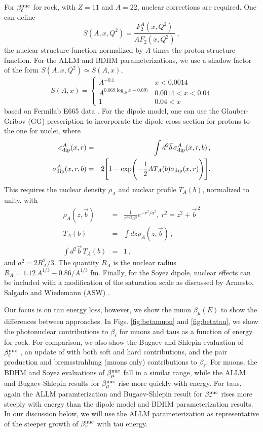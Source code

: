 \documentclass[aps,10pt,twocolumn,tightenlines]{revtex4-1}
\begin{document}
For $\beta_\ell^{\rm nuc}$ for rock, with $Z=11$ and $A=22$, nuclear corrections are required. 
One can define
\begin{equation}
S (A,x,Q^2) = \frac{F_2^A(x,Q^2)}{A F_2(x, Q^2)}\ ,
\end{equation}
the nuclear structure function normalized by $A$ times the proton structure function.
For the ALLM and BDHM parameterizations, we use a shadow factor  of the form $S(A,x,Q^2)\simeq
S(A,x)$,
\[
S(A,x)
= \left\{ \begin{array} {cl}
A^{-0.1} & x<0.0014 \\
A^{0.069\log_{10}x+0.097 }& 0.0014<x<0.04 \\
1 & 0.04<x
\end{array}\right.
\]
based on Fermilab E665 data \cite{Adams:1992vm,Adams:1992nf,Adams:1995is}. For the dipole model, one can use the
Glauber-Gribov (GG) prescription to incorporate the dipole cross section for 
 protons to the one for nuclei, where 
\begin{eqnarray}
\sigma_{\rm dip}^A(x,r)&=&\int d^2\vec{b}\, \sigma_{\rm dip}^A(x,r,b)\, ,\\
\sigma_{\rm dip}^A(x,r,b) &=& 2\Biggl[ 1-\exp\Biggl( -\frac{1}{2} AT_A(b)\sigma_{\rm dip}(x,r)\Biggr)\Biggr] .
\end{eqnarray}
This requires the nuclear density $\rho_A$ and nuclear profile $T_A(b)$, normalized to unity, with
\begin{eqnarray}
\rho_A (z,\vec{b}) &= &\frac{1}{\pi^{3/2} a^3} e^{-r^2/a^2},\   r^2=z^2+\vec{b}^{\, 2}\\
T_A(b) &=& \int dz\rho_A(z,\vec{b})\, ,\\
\int d^2 \vec{b}\, T_A(b)&=& 1\ ,
\end{eqnarray}
and $a^2=2 R_A^2/3$. The quantity $R_A$ is the nuclear radius $R_A = 1.12\, A^{1/3}-0.86/A^{1/3}$ fm.
Finally, for the Soyez dipole, nuclear effects can be included with a modification of the saturation scale as discussed 
by 
Armesto, Salgado and Wiedemann (ASW) \cite{Armesto:2004ud}.

Our focus is on tau energy loss, however, we show the muon $\beta_\mu(E)$ to show the differences between approaches. 
In Figs. \ref{fig:betamuon} and \ref{fig:betatau}, we show the photonuclear contributions to $\beta_\ell$ for muons and taus as a function of 
energy for rock. 
For comparison, we also show the Bugaev and Shlepin evaluation of $\beta_\ell^{\rm nuc}$ \cite{Bugaev:2002gy}, an update of \cite{Bezrukov:1981ci}
with both soft and hard contributions,  and the pair production and bremsstrahlung (muons only) contributions to $\beta_\ell$.
For muons, the BDHM and Soyez evaluations of $\beta_\mu^{\rm nuc}$ fall in a similar range, while the  ALLM and
Bugaev-Shlepin results for $\beta_\mu^{\rm nuc}$ rise more quickly with energy. 
For taus, again the ALLM paramterization and Bugaev-Shlepin result for 
$\beta_\tau^{\rm nuc}$ rises 
 more steeply with energy than the
dipole model and BDHM parameterization results. 
In our discussion below, we will use the ALLM parameterization as representative of the steeper growth of $\beta_\tau^{\rm nuc}$ with tau energy.
\end{document}
